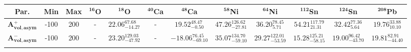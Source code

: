 \bgroup
\def\arraystretch{1.5}%
\begin{tabular}{ c c c c c c c c c c c c} 
\textbf{Par.} & \textbf{Min} & \textbf{Max} & \textbf{$\mathbf{^{16}}$O}& \textbf{$\mathbf{^{18}}$O}& \textbf{$\mathbf{^{40}}$Ca}& \textbf{$\mathbf{^{48}}$Ca}& \textbf{$\mathbf{^{58}}$Ni}& \textbf{$\mathbf{^{64}}$Ni}& \textbf{$\mathbf{^{112}}$Sn}& \textbf{$\mathbf{^{124}}$Sn}& \textbf{$\mathbf{^{208}}$Pb}\\
 \hline 
$\mathbf{A_{vol,asym}^{+}}$ & -100 & 200 & - & $22.06^{67.68}_{-14.27}$ & - & $19.52^{48.47}_{-0.50}$ & $47.26^{126.62}_{-27.81}$ & $36.20^{78.45}_{5.71}$ & $54.21^{117.79}_{21.31}$ & $32.42^{77.36}_{5.64}$ & $19.76^{33.88}_{10.10}$\\ 
$\mathbf{A_{vol,asym}^{-}}$ & -100 & 200 & - & $23.20^{129.03}_{-47.92}$ & - & $-18.06^{76.45}_{-69.10}$ & $35.07^{134.70}_{-59.10}$ & $29.27^{122.01}_{-53.59}$ & $15.28^{125.21}_{-58.15}$ & $19.00^{96.42}_{-43.70}$ & $19.81^{82.91}_{-44.40}$\\ 
\\ 
\end{tabular}
\egroup